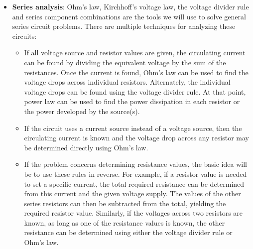 \documentclass{report}
\begin{document}
\begin{itemize}
            \begin{align*}
                V_{R_{x}} = IR_{x} = \frac{E}{R_{\text{total}}} \cdot R_{x} = E \cdot \frac{R_{x}}{R_{\text{total}}}
            .\end{align*}
            It is worth pointing out that “the resistor of interest” can, in fact, be the sum of multiple resistors in series.
            \bigbreak \noindent 
            While VDR is not required for any particular analysis, it serves two purposes: first, it saves some time because it skips over the computation of current, and second, it reinforces the ideal of a proportional division of voltage in a series connection. For example, if there are two resistors in series and one of them is twice the size of the other, then it must be the case that the larger resistor sees twice the voltage of the smaller resistor.
        \item \textbf{Series analysis}: Ohm's law, Kirchhoff's voltage law, the voltage divider rule and series component combinations are the tools we will use to solve general series circuit problems. There are multiple techniques for analyzing these circuits:
            \begin{itemize}
                \item If all voltage source and resistor values are given, the circulating current can be found by dividing the equivalent voltage by the sum of the resistances. Once the current is found, Ohm's law can be used to find the voltage drops across individual resistors. Alternately, the individual voltage drops can be found using the voltage divider rule. At that point, power law can be used to find the power dissipation in each resistor or the power developed by the source(s).
                \item If the circuit uses a current source instead of a voltage source, then the circulating current is known and the voltage drop across any resistor may be determined directly using Ohm's law.
                \item If the problem concerns determining resistance values, the basic idea will be to use these rules in reverse. For example, if a resistor value is needed to set a specific current, the total required resistance can be determined from this current and the given voltage supply. The values of the other series resistors can then be subtracted from the total, yielding the required resistor value. Similarly, if the voltages across two resistors are known, as long as one of the resistance values is known, the other resistance can be determined using either the voltage divider rule or Ohm's law. 

\end{itemize}
\end{itemize}
\end{document}
